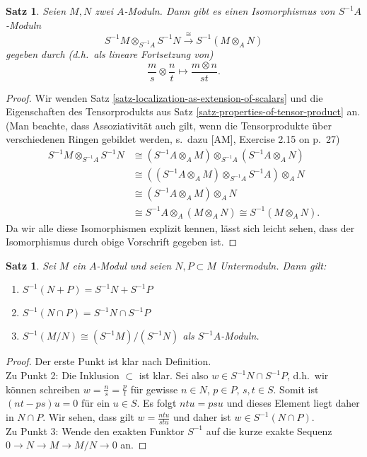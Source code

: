 \documentclass[reqno,12pt]{article}
\numberwithin{equation}{section}
\theoremstyle{plain}
\newtheorem{proposition}[thm]{Satz}
\theoremstyle{definition}
\begin{document}
\begin{proposition}\label{satz-distributivity-of-localization}
Seien $M, N$ zwei $A$-Moduln. Dann gibt es einen Isomorphismus von $S^{-1}A$-Moduln
$$S^{-1}M\otimes_{S^{-1}A}S^{-1}N\overset{\cong}{\longrightarrow}S^{-1}(M\otimes_A N)$$
gegeben durch (d.h.\ als lineare Fortsetzung von)
$$\frac{m}{s}\otimes \frac{n}{t} \longmapsto \frac{m\otimes n}{st}.$$
\end{proposition}
\begin{proof}
Wir wenden Satz \ref{satz-localization-as-extension-of-scalars} und die Eigenschaften des Tensorprodukts aus Satz \ref{satz-properties-of-tensor-product} an. (Man beachte, dass Assoziativität auch gilt, wenn die Tensorprodukte über verschiedenen Ringen gebildet werden, s.\ dazu [AM], Exercise 2.15 on p.~27)
\begin{align*}
S^{-1}M\otimes_{S^{-1}A} S^{-1}N &\cong (S^{-1}A\otimes_A M)\otimes_{S^{-1}A}(S^{-1}A\otimes_{A}N)\\
&\cong \left((S^{-1}A\otimes_A M)\otimes_{S^{-1}A}S^{-1}A\right)\otimes_A N\\
&\cong (S^{-1}A\otimes_A M)\otimes_A N\\
&\cong S^{-1}A\otimes_A (M\otimes_A N)\cong S^{-1}(M\otimes_A N).
\end{align*}
Da wir alle diese Isomorphismen explizit kennen, lässt sich leicht sehen, dass der Isomorphismus durch obige Vorschrift gegeben ist.
\end{proof}

\begin{proposition}
Sei $M$ ein $A$-Modul und seien $N,P\subset M$ Untermoduln. Dann gilt:
\begin{enumerate}
	\item $S^{-1}(N+P)=S^{-1}N+S^{-1}P$
	\item $S^{-1}(N\cap P)=S^{-1}N\cap S^{-1}P$
	\item $S^{-1}(M/N)\cong (S^{-1}M)/(S^{-1}N)$ als $S^{-1}A$-Moduln.
\end{enumerate}
\end{proposition}
\begin{proof}
Der erste Punkt ist klar nach Definition.\\
Zu Punkt 2: Die Inklusion $\subset$ ist klar. Sei also $w\in S^{-1}N\cap S^{-1}P$, d.h.\ wir können schreiben $w=\frac{n}{s}=\frac{p}{t}$ für gewisse $n\in N$, $p\in P$, $s,t\in S$. Somit ist $(nt-ps)u=0$ für ein $u\in S$. Es folgt $ntu=psu$ und dieses Element liegt daher in $N\cap P$. Wir sehen, dass gilt $w=\frac{ntu}{stu}$ und daher ist $w\in S^{-1}(N\cap P)$.\\
Zu Punkt 3: Wende den exakten Funktor $S^{-1}$ auf die kurze exakte Sequenz $0\to N\to M\to M/N\to 0$ an.
\end{proof}
\end{document}

